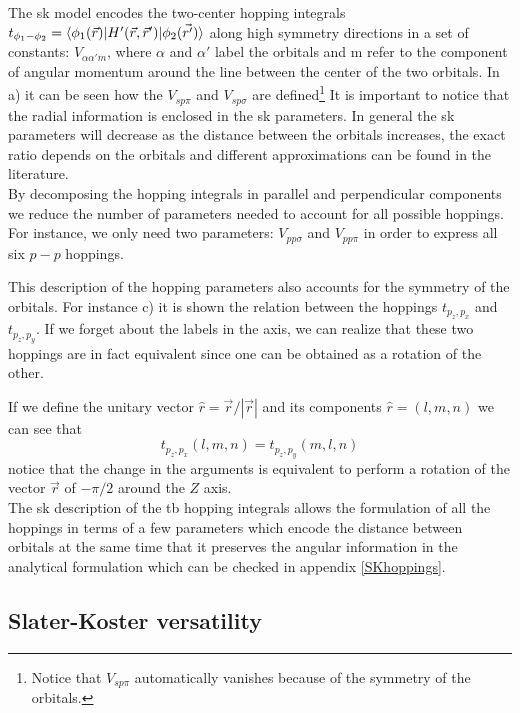 The \ac{sk} model encodes the two-center hopping integrals $t_{\phi_1-\phi_2} = \langle\phi_1(\vec{r})|H'(\vec{r},\vec{r}')|\phi_2(\vec{r'})\rangle$ along high symmetry directions in a set of constants: $V_{\alpha\alpha'm}$, where $\alpha$ and $\alpha'$ label the orbitals and m refer to the component of angular momentum around the line between the center of the two orbitals. In a) it can be seen how the $V_{sp\pi}$ and $V_{sp\sigma}$ are defined\footnote{Notice that $V_{sp\pi}$ automatically vanishes because of the symmetry of the orbitals.}
It is important to notice that the radial information is enclosed in the \ac{sk} parameters. In general the \ac{sk} parameters will decrease as the distance between the orbitals increases, the exact ratio depends on the orbitals and different approximations can be found in the literature.\cite{Harrison1930}\\


By decomposing the hopping integrals in parallel and perpendicular components we reduce the number of parameters needed to account for all possible hoppings. For instance, we only need two parameters: $V_{pp\sigma}$ and $V_{pp\pi}$ in order to express all six $p-p$ hoppings.

This description of the hopping parameters also accounts for the symmetry of the orbitals. For instance c) it is shown the relation between the hoppings $t_{p_{z},p_{x}}$ and $t_{p_{z},p_{y}}$. If we forget about the labels in the axis, we can realize that these two hoppings are in fact equivalent since one can be obtained as a rotation of the other.

If we define the unitary vector $\hat{r} = \vec{r}/|\vec{r}|$ and its components $\hat{r}=(l,m,n)$ we can see that
\begin{equation}
  t_{p_{z},p_{x}} (l,m,n) = t_{p_{z},p_{y}}(m,l,n)
\end{equation}
notice that the change in the arguments is equivalent to perform a rotation of the vector $\vec{r}$ of $-\pi/2$ around the $Z$ axis.\\

The \ac{sk} description of the \ac{tb} hopping integrals allows the formulation of all the hoppings in terms of a few parameters which encode the distance between orbitals at the same time that it preserves the angular information in the analytical formulation which can be checked in appendix \ref{SKhoppings}.


\subsection{Slater-Koster versatility}
